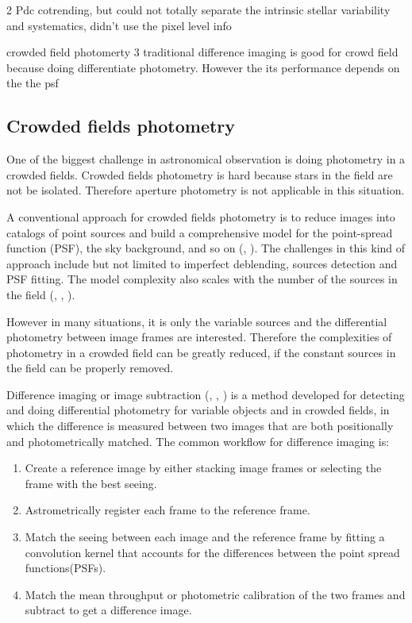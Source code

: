 \documentclass[12pt, preprint]{aastex}
\begin{document}
2 Pdc cotrending, but could not totally separate the intrinsic stellar variability and  systematics, didn’t use the pixel level info

crowded field photomerty
3 traditional difference imaging is good for crowd field because doing differentiate photometry. However the its performance depends on the the psf

\subsection{Crowded fields photometry}
One of the biggest challenge in astronomical observation is doing photometry in a crowded fields.
Crowded fields photometry is hard because stars in the field are not be isolated.
Therefore aperture photometry is not applicable in this situation.

A conventional approach for crowded fields photometry is to reduce images into catalogs of point sources and build a comprehensive model for the point-spread function (PSF),  the sky background, and so on (\citealt{psf1}, \citealt{psf2}).
The challenges in this kind of approach include but not limited to imperfect deblending, sources detection and PSF fitting.
The model complexity also scales with the number of the sources in the field (\citealt{crowd1}, \citealt{crowd2}, \citealt{crowd3}).

However in many situations, it is only the variable sources and the differential photometry between image frames are interested.
Therefore the complexities of photometry in a crowded field can be greatly reduced, if the constant sources in the field can be properly removed.

Difference imaging or image subtraction (\citealt{imagesub1}, \citealt{alard}, \citealt{varyingkernel}) is a method developed for detecting and doing differential photometry for variable objects and in crowded fields, in which the difference is measured between two images that are both positionally and photometrically matched.
The common workflow for difference imaging is:
\begin{enumerate}
\item
Create a reference image by either stacking image frames or selecting the frame with the best seeing.
\item
Astrometrically register each frame to the reference frame.
\item
Match the seeing between each image and the reference frame by fitting a convolution kernel that accounts for the differences between the point spread functions(PSFs).
\item
Match the mean throughput or photometric calibration of the two frames and subtract to get a difference image.
\end{enumerate}
\end{document}
